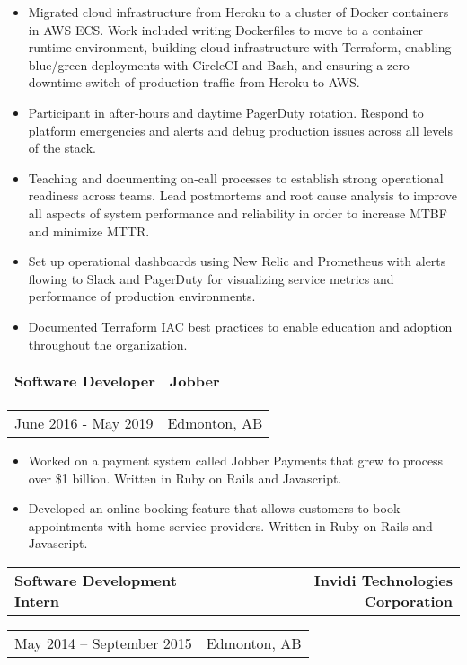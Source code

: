 \documentclass[10pt,letterpaper]{article}
\makeatletter
\newcommand{\headerrow}[2]
{\begin{tabular*}{\linewidth}{l@{\extracolsep{\fill}}r}
	#1 &
	#2 \\
\end{tabular*}}
\makeatother
\begin{document}
       \begin{itemize}
          \itemsep0em
                \item Migrated cloud infrastructure from Heroku to a cluster of Docker containers in AWS ECS. Work included writing Dockerfiles to move to a container runtime environment, building cloud infrastructure with Terraform, enabling blue/green deployments with CircleCI and Bash, and ensuring a zero downtime switch of production traffic from Heroku to AWS.
                \item Participant in after-hours and daytime PagerDuty rotation. Respond to platform emergencies and alerts and debug production issues across all levels of the stack.
                \item Teaching and documenting on-call processes to establish strong operational readiness across teams. Lead postmortems and root cause analysis to improve all aspects of system performance and reliability in order to increase MTBF and minimize MTTR.
                \item Set up operational dashboards using New Relic and Prometheus with alerts flowing to Slack and PagerDuty for visualizing service metrics and performance of production environments.
                \item Documented Terraform IAC best practices to enable education and adoption throughout the organization.
        \end{itemize}
       \headerrow
       	        {\textbf{Software Developer}}
	        {\textbf{Jobber}}
	\headerrow
		{June 2016 - May 2019}
		{Edmonton, AB}

       \begin{itemize}
          \itemsep0em
                \item Worked on a payment system called Jobber Payments that grew to process over \$1 billion. Written in Ruby on Rails and Javascript.
                \item Developed an online booking feature that allows customers to book appointments with home service providers. Written in Ruby on Rails and Javascript.
        \end{itemize}	
       \headerrow
                {\textbf{Software Development Intern}}
		{\textbf{Invidi Technologies Corporation}}
       \headerrow
		{May 2014 -- September 2015 }
                {Edmonton, AB}
\end{document}

